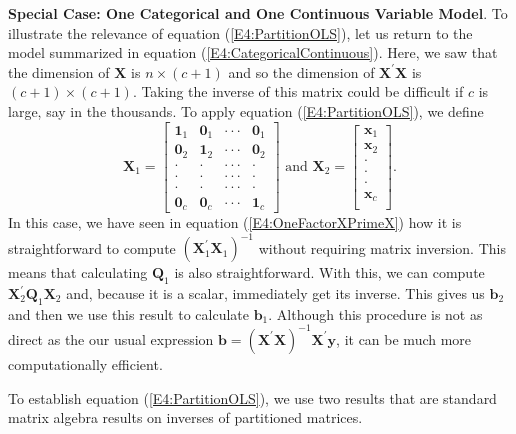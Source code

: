 \textbf{Special Case: One Categorical and One Continuous Variable Model}.
To illustrate the relevance of equation (\ref{E4:PartitionOLS}), let us return to
the model summarized in equation (\ref{E4:CategoricalContinuous}). Here,
we saw that the dimension of $\mathbf{X}$ is $n \times (c+1)$ and so the dimension of
$\mathbf{X}^{\prime}\mathbf{X}$ is $(c+1) \times (c+1)$. Taking the inverse of this
matrix could be difficult if $c$ is large, say in the thousands. To apply equation
(\ref{E4:PartitionOLS}), we define
\begin{equation*}
\mathbf{X}_1=
\begin{bmatrix}
\mathbf{1}_1 & \mathbf{0}_1 & \cdot \cdot \cdot  & \mathbf{0}
_1 \\
\mathbf{0}_2 & \mathbf{1}_2 & \cdot \cdot \cdot  & \mathbf{0}
_2 \\
\cdot  & \cdot  & \cdot \cdot \cdot  & \cdot  \\
\cdot  & \cdot  & \cdot \cdot \cdot  & \cdot  \\
\cdot  & \cdot  & \cdot \cdot \cdot  & \cdot  \\
\mathbf{0}_{c} & \mathbf{0}_{c} & \cdot \cdot \cdot  & \mathbf{1}_c
\end{bmatrix}
\text{ \ \ \ \ and \ \ \ }\mathbf{X}_2 =
\begin{bmatrix}
\mathbf{x}_1\\
\mathbf{x}_2 \\
\cdot  \\
\cdot  \\
\cdot  \\
\mathbf{x}_c \\
\end{bmatrix} .
\end{equation*}
In this case, we have seen in equation (\ref{E4:OneFactorXPrimeX}) how it
is straightforward to compute
$\left(\mathbf{X}_1^{\prime}\mathbf{X}_1 \right)^{-1}$ without requiring
matrix inversion. This means that calculating $\mathbf{Q}_1$ is also straightforward. With this,
we can compute $\mathbf{X}_2^{\prime} \mathbf{Q}_1 \mathbf{X}_2$ and, because it is a scalar,
immediately get its inverse. This gives us $\mathbf{b}_2$ and then we use this result to
calculate $\mathbf{b}_1$. Although this procedure is not as direct as the our usual expression
$\mathbf{b} = \left( \mathbf{X}^{\prime}\mathbf{X}\right)^{-1}
\mathbf{X}^{\prime}\mathbf{y}$, it can be much more computationally efficient.

\linejed

To establish equation (\ref{E4:PartitionOLS}),
we use two results that are standard matrix algebra results on
inverses of partitioned matrices.

